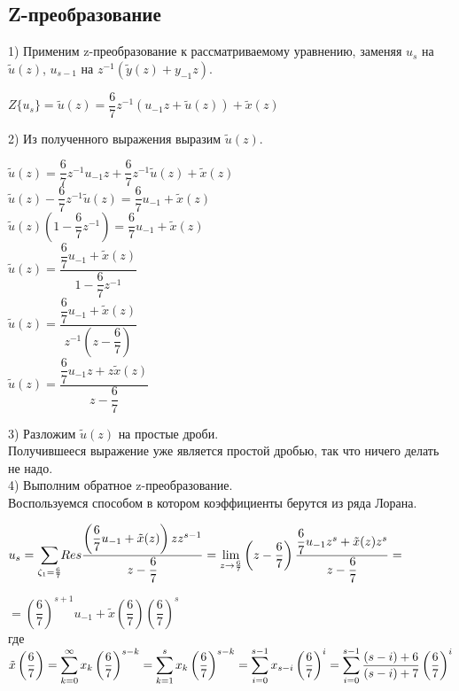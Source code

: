 \documentclass[14pt,fleqn]{extarticle}
\begin{document}
	\subsection*{Z-преобразование}
	1) Применим z-преобразование к рассматриваемому уравнению, заменяя $u_s$ на $\tilde{u}(z)$, $u_{s-1}$ на $z^{-1}(\tilde{y}(z)+y_{-1}z)$.
	\begin{center}
		$Z\{u_s\} = \tilde{u}(z) = \dfrac{6}{7}z^{-1}(u_{-1}z + \tilde{u}(z))+\tilde{x}(z)$\\
	\end{center}

	2) Из полученного выражения выразим $\tilde{u}(z)$.
	\begin{center}
		$\tilde{u}(z) = \dfrac{6}{7}z^{-1}u_{-1}z + \dfrac{6}{7}z^{-1}\tilde{u}(z)+\tilde{x}(z)$\\
		$\tilde{u}(z) - \dfrac{6}{7}z^{-1}\tilde{u}(z) = \dfrac{6}{7}u_{-1} + \tilde{x}(z)$\\
		$\tilde{u}(z) (1 - \dfrac{6}{7}z^{-1}) = \dfrac{6}{7}u_{-1} + \tilde{x}(z)$\\
		$\tilde{u}(z) = \dfrac{\dfrac{6}{7}u_{-1} + \tilde{x}(z)}{1 - \dfrac{6}{7}z^{-1}}$\\
		$\tilde{u}(z) = \dfrac{\dfrac{6}{7}u_{-1} + \tilde{x}(z)}{z^{-1}(z - \dfrac{6}{7})}$\\
		$\tilde{u}(z) = \dfrac{\dfrac{6}{7}u_{-1}z + z\tilde{x}(z)}{z - \dfrac{6}{7}}$\\
	\end{center}
	3) Разложим $\tilde{u}(z)$ на простые дроби.\\
	Получившееся выражение уже является простой дробью, так что ничего делать не надо.\\
	
	4) Выполним обратное z-преобразование.\\
	Воспользуемся способом в котором коэффициенты берутся из ряда Лорана.
	\begin{center}
		$u_s = \smashoperator[r]{\sum_{\zeta_1=\frac{6}{7}}} Res\dfrac{\left(\dfrac{6}{7}u_{-1} + \tilde{x}(z)\right)zz^{s-1}}{z - \dfrac{6}{7}} = \lim_{z\to\frac{6}{7}} \left(z - \dfrac{6}{7}\right)\dfrac{\dfrac{6}{7}u_{-1}z^s + \tilde{x}(z)z^s}{z - \dfrac{6}{7}} = $
	\end{center}
		$= \left(\dfrac{6}{7}\right)^{s+1} u_{-1} + \tilde{x}\left(\dfrac{6}{7}\right)\left(\dfrac{6}{7}\right)^s$\\
	где $\tilde{x}\left(\dfrac{6}{7}\right) = \smashoperator[r]{\sum_{k=0}^{\infty}}x_k\left(\dfrac{6}{7}\right)^{s-k} = \smashoperator[r]{\sum_{k=1}^{s}}x_k\left(\dfrac{6}{7}\right)^{s-k} = \smashoperator[r]{\sum_{i=0}^{s-1}}x_{s-i}\left(\dfrac{6}{7}\right)^{i} = \smashoperator[r]{\sum_{i=0}^{s-1}}\dfrac{(s-i)+6}{(s-i)+7}\left(\dfrac{6}{7}\right)^i$
	
\end{document}
